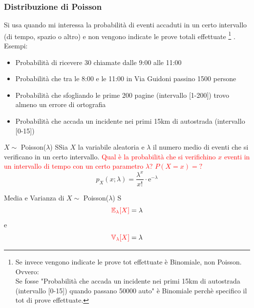 \documentclass{article}  %
\theoremstyle{definition}
\begin{document}
\subsubsection{Distribuzione di Poisson}
Si usa quando mi interessa la probabilità di eventi accaduti in un certo intervallo (di tempo, spazio o altro) e non vengono indicate le prove totali effettuate
\footnote{Se invece vengono indicate le prove tot effettuate è Binomiale, non Poisson. Ovvero: \\
	Se fosse "Probabilità che accada un incidente nei primi 15km di autostrada (intervallo [0-15]) quando passano 50000 auto" è Binomiale perchè specifico il tot di prove effettuate.}
. Esempi:
\begin{itemize}
	\item Probabilità di ricevere 30 chiamate dalle 9:00 alle 11:00
	\item Probabilità che tra le 8:00 e le 11:00 in Via Guidoni passino 1500 persone
	\item Probabilità che sfogliando le prime 200 pagine (intervallo [1-200]) trovo almeno un errore di ortografia
	\item Probabilità che accada un incidente nei primi 15km di autostrada (intervallo [0-15])
\end{itemize}
\begin{theorem}{$X \sim$ Poisson($\lambda$)}
	SSia $X$ la variabile aleatoria e $\lambda$ il numero medio di eventi che si verificano in un certo intervallo. \textcolor{red}{Qual è la probabilità che
		si verifichino $x$ eventi in un intervallo di tempo con un certo parametro $\lambda$? $P(X=x)=?$}
	\[
		p_X(x;\lambda)=\frac{\lambda^x}{x!}\cdot \mathrm{e}^{-\lambda}
	\]
\end{theorem}
\begin{theorem}{Media e Varianza di $X \sim$ Poisson($\lambda$)}
	S\[
		\textcolor{red}{\mathbb{E}_{\lambda}[X]}=\lambda
	\]
	e
	\[
		\textcolor{red}{\mathbb{V}_{\lambda}[X]}=\lambda
	\]
\end{theorem}
\end{document}
